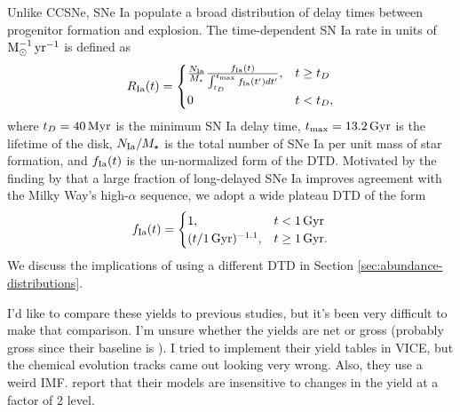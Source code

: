 \documentclass[twocolumn,twocolappendix,linenumbers]{aastex631}
\newcommand{\todo}[1]{{\color{red}#1}}
\begin{document}
Unlike CCSNe, SNe Ia populate a broad distribution of delay times between progenitor formation and explosion. The time-dependent SN Ia rate in units of ${\rm M}_\odot^{-1}\,{\rm yr}^{-1}$ is defined as
\begin{equation}
    R_{\rm Ia}(t) = 
    \begin{cases}
        \frac{N_{\rm Ia}}{M_\star}
        \frac{f_{\rm Ia}(t)}{\int_{t_D}^{t_{\rm max}} f_{\rm Ia}(t') dt'}, & t \ge t_D \\
        0 & t < t_D,
    \end{cases}
    \label{eq:dtd-function}
\end{equation}
where $t_D=40\,{\rm Myr}$ is the minimum SN Ia delay time, $t_{\rm max}=13.2\,{\rm Gyr}$ is the lifetime of the disk, $N_{\rm Ia}/M_\star$ is the total number of SNe Ia per unit mass of star formation, and $f_{\rm Ia}(t)$ is the un-normalized form of the DTD. Motivated by the finding by \citet{dubay_galactic_2024} that a large fraction of long-delayed SNe Ia improves agreement with the Milky Way's high-$\alpha$ sequence, we adopt a wide plateau DTD of the form
\begin{equation}
    \label{eq:plateau-dtd}
    f_{\rm Ia}(t) =
    \begin{cases}
        1, & t < 1\,{\rm Gyr} \\
        (t/1\,{\rm Gyr})^{-1.1}, & t \ge 1\,{\rm Gyr}.
    \end{cases}
\end{equation}
We discuss the implications of using a different DTD in Section \ref{sec:abundance-distributions}.

\todo{I'd like to compare these yields to previous studies, but it's been very difficult to make that comparison. I'm unsure whether the \citet{francois_evolution_2004} yields are net or gross (probably gross since their baseline is \citet{woosley_evolution_1995}). I tried to implement their yield tables in VICE, but the chemical evolution tracks came out looking very wrong. Also, they use a weird IMF.} \citet{francois_evolution_2004} report that their models are insensitive to changes in the yield at a factor of 2 level.
\end{document}
